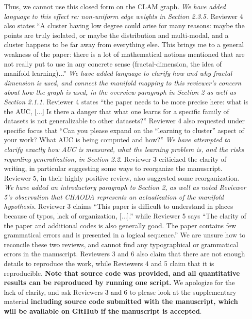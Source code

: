 \documentclass{article}
\begin{document}
Thus, we cannot use this closed form on the CLAM graph.
\emph{We have added language to this effect re: non-uniform edge weights in Section 2.3.5.}
Reviewer 4 also states ``A cluster having low degree could arise for many reasons: maybe the points are truly isolated, or maybe the distribution and multi-modal, and a cluster happens to be far away from everything else. 
This brings me to a general weakness of the paper: there is a lot of mathematical notions mentioned that are not really put to use in any concrete sense (fractal-dimension, the idea of manifold learning)...''
\emph{We have added language to clarify how and why fractal dimension is used, and connect the manifold mapping to this reviewer's concern about how the graph is used, in the overview paragraph in Section 2 as well as Section 2.1.1}.
Reviewer 4 states ``the paper needs to be more precise here: what is the AUC, [...] Is there a danger that what one learns for a specific family of datasets is not generalizable to other datasets?''
Reviewer 4 also requested under specific focus that ``Can you please expand on the ``learning to cluster'' aspect of your work? What AUC is being computed and how?''
\emph{We have attempted to clarify exactly how AUC is measured, what the learning problem is, and the risks regarding generalization, in Section 2.2}.
Reviewer 3 criticized the clarity of writing, in particular suggesting some ways to reorganize the manuscript.
Reviewer 5, in their highly positive review, also suggested some reorganization.
\emph{We have added an introductory paragraph to Section 2, as well as noted Reviewer 5's observation that CHAODA represents an actualization of the manifold hypothesis.}
Reviewer 3 claims ``This paper is difficult to understand in places because of typos, lack of organization, [...].'' while Reviewer 5 says ``The clarity of the paper and additional codes is also generally good. The paper contains few grammatical errors and is presented in a logical sequence.''
We are unsure how to reconcile these two reviews, and cannot find any typographical or grammatical errors in the manuscript.
Reviewers 3 and 6 also claim that there are not enough details to reproduce the work, while Reviewers 4 and 5 claim that it is reproducible.
\textbf{Note that source code was provided, and all quantitative results can be reproduced by running one script.}
We apologize for the lack of clarity, and ask Reviewers 3 and 6 to please look at the supplementary material \textbf{including source code submitted with the manuscript, which will be available on GitHub if the manuscript is accepted}.
\end{document}

